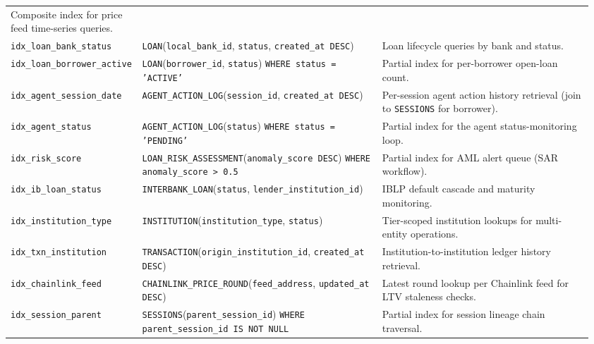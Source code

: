 \documentclass[12pt,a4paper]{report}
\begin{document}
\begin{table}[H]
\begin{tabular}{@{}%
  >{\raggedright\arraybackslash}p{0.19\linewidth}%
  >{\raggedright\arraybackslash}p{0.41\linewidth}%
  >{\raggedright\arraybackslash}p{0.36\linewidth}@{}}
  Composite index for price feed time-series queries. \\
\texttt{idx\_loan\_bank\_status} &
  \texttt{LOAN}(\texttt{local\_bank\_id}, \texttt{status},\newline
  \texttt{created\_at DESC}) &
  Loan lifecycle queries by bank and status. \\
\texttt{idx\_loan\_borrower\_active} &
  \texttt{LOAN}(\texttt{borrower\_id}, \texttt{status})\newline
  \texttt{WHERE status = 'ACTIVE'} &
  Partial index for per-borrower open-loan count. \\
\texttt{idx\_agent\_session\_date} &
  \texttt{AGENT\_ACTION\_LOG}(\texttt{session\_id},\newline
  \texttt{created\_at DESC}) &
  Per-session agent action history retrieval (join to \texttt{SESSIONS} for borrower). \\
\texttt{idx\_agent\_status} &
  \texttt{AGENT\_ACTION\_LOG}(\texttt{status})\newline
  \texttt{WHERE status = 'PENDING'} &
  Partial index for the agent status-monitoring loop. \\
\texttt{idx\_risk\_score} &
  \texttt{LOAN\_RISK\_ASSESSMENT}(\texttt{anomaly\_score DESC})\newline
  \texttt{WHERE anomaly\_score > 0.5} &
  Partial index for AML alert queue (SAR workflow). \\
\texttt{idx\_ib\_loan\_status} &
  \texttt{INTERBANK\_LOAN}(\texttt{status}, \texttt{lender\_institution\_id}) &
  IBLP default cascade and maturity monitoring. \\
\texttt{idx\_institution\_type} &
  \texttt{INSTITUTION}(\texttt{institution\_type}, \texttt{status}) &
  Tier-scoped institution lookups for multi-entity operations. \\
\texttt{idx\_txn\_institution} &
  \texttt{TRANSACTION}(\texttt{origin\_institution\_id}, \texttt{created\_at DESC}) &
  Institution-to-institution ledger history retrieval. \\
\texttt{idx\_chainlink\_feed} &
  \texttt{CHAINLINK\_PRICE\_ROUND}(\texttt{feed\_address},\newline
  \texttt{updated\_at DESC}) &
  Latest round lookup per Chainlink feed for LTV staleness checks. \\
\texttt{idx\_session\_parent} &
  \texttt{SESSIONS}(\texttt{parent\_session\_id})\newline
  \texttt{WHERE parent\_session\_id IS NOT NULL} &
  Partial index for session lineage chain traversal. \\

\end{tabular}
\end{table}
\end{document}
